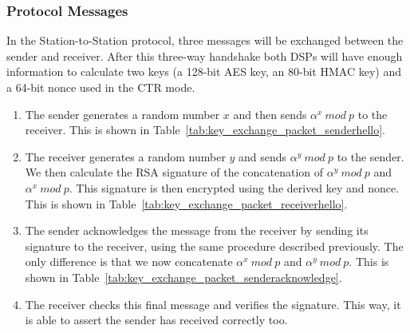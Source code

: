 \documentclass[a4paper]{article}
\begin{document}
\subsubsection{Protocol Messages}
In the Station-to-Station protocol, three messages will be exchanged between the sender and receiver. After this three-way handshake both DSPs will have enough information to calculate two keys (a 128-bit AES key, an 80-bit HMAC key) and a 64-bit nonce used in the CTR mode.

\begin{enumerate}
    \item The sender generates a random number $x$ and then sends $\alpha^x\ mod\ p$ to the receiver. This is shown in Table~\ref{tab:key_exchange_packet_senderhello}.
    \item The receiver generates a random number $y$ and sends $\alpha^y\ mod\ p$ to the sender. We then calculate the RSA signature of the concatenation of $\alpha^y\ mod\ p$ and $\alpha^x\ mod\ p$. This signature is then encrypted using the derived key and nonce. This is shown in Table~\ref{tab:key_exchange_packet_receiverhello}.
    \item The sender acknowledges the message from the receiver by sending its signature to the receiver, using the same procedure described previously. The only difference is that we now concatenate $\alpha^x\ mod\ p$ and $\alpha^y\ mod\ p$. This is shown in Table~\ref{tab:key_exchange_packet_senderacknowledge}.
    \item The receiver checks this final message and verifies the signature. This way, it is able to assert the sender has received correctly too.
\end{enumerate}
\end{document}

